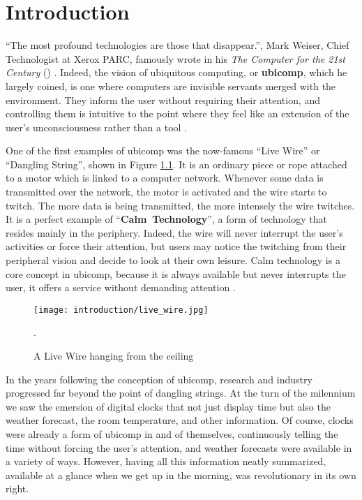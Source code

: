 \chapter{Introduction} \label{chap:intro}
``The most profound technologies are those that disappear.'', Mark Weiser, Chief Technologist at Xerox PARC, famously wrote in his \textit{The Computer for the 21st Century} (\citeyear{weiser1991computer}) \cite{weiser1991computer}. Indeed, the vision of ubiquitous computing, or \mbox{\textbf{ubicomp}}, which he largely coined, is one where computers are invisible servants merged with the environment. They inform the user without requiring their attention, and controlling them is intuitive to the point where they feel like an extension of the user's unconsciousness rather than a tool \cite{weiser1997coming}.

One of the first examples of ubicomp was the now-famous ``Live Wire'' or ``Dangling String'', shown in Figure \ref{fig:live_wire}. It is an ordinary piece or rope attached to a motor which is linked to a computer network. Whenever some data is transmitted over the network, the motor is activated and the wire starts to twitch. The more data is being transmitted, the more intensely the wire twitches. It is a perfect example of ``\mbox{\textbf{Calm Technology}}'', a form of technology that resides mainly in the periphery. Indeed, the wire will never interrupt the user's activities or force their attention, but users may notice the twitching from their peripheral vision and decide to look at their own leisure. Calm technology is a core concept in ubicomp, because it is always available but never interrupts the user, it offers a service without demanding attention \cite{weiser1996designing}.

\begin{figure}
    \centering
    \texttt{[image: introduction/live\_wire.jpg]}
    \caption{A Live Wire hanging from the ceiling \cite{weiser1996designing}}.
    \label{fig:live_wire}
\end{figure}

In the years following the conception of ubicomp, research and industry progressed far beyond the point of dangling strings. At the turn of the milennium we saw the emersion of digital clocks that not just display time but also the weather forecast, the room temperature, and other information. Of course, clocks were already a form of ubicomp in and of themselves, continuously telling the time without forcing the user's attention, and weather forecasts were available in a variety of ways. However, having all this information neatly summarized, available at a glance when we get up in the morning, was revolutionary in its own right.

